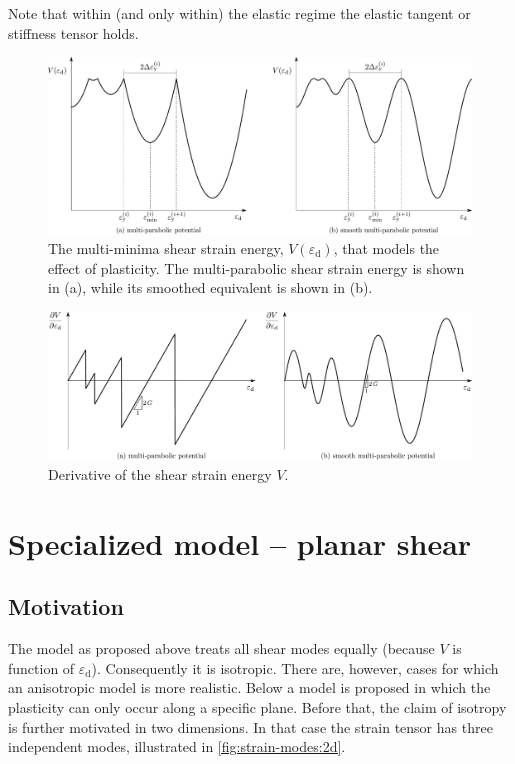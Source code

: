 \documentclass[fleqn, colorlinks]{goose-article}
\begin{document}
Note that within (and only within) the elastic regime the
elastic tangent or stiffness tensor holds.

\begin{figure}[htp]
    \centering
    \includegraphics[width=1.\textwidth]{figures/potential_V-plas}
    \caption{
        The multi-minima shear strain energy, $V ( \varepsilon_\mathrm{d} )$,
        that models the effect of plasticity.
    The multi-parabolic shear strain energy is shown in (a),
    while its smoothed equivalent is shown in (b).}
    \label{fig:V:plas}
\end{figure}

\begin{figure}[htp]
    \centering
    \includegraphics[width=1.\textwidth]{figures/potential_dV-plas}
    \caption{Derivative of the shear strain energy $V$.}
    \label{fig:dV:plas}
\end{figure}

\section{Specialized model -- planar shear}

\subsection{Motivation}

The model as proposed above treats all shear modes equally
(because $V$ is function of $\varepsilon_\mathrm{d}$).
Consequently it is isotropic.
There are, however, cases for which an anisotropic model is more realistic.
Below a model is proposed in which the plasticity can only occur along a specific plane.
Before that, the claim of isotropy is further motivated in two dimensions.
In that case the strain tensor has three independent modes,
illustrated in \cref{fig:strain-modes:2d}.
\end{document}
